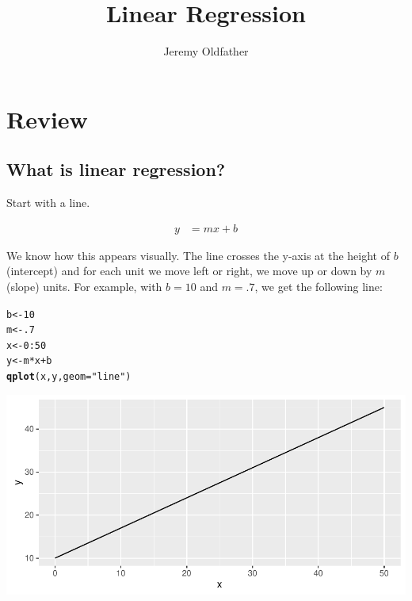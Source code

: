 \documentclass[10pt]{article}\usepackage[]{graphicx}\usepackage[]{color}
\makeatletter
\def\maxwidth{ %
  \ifdim\Gin@nat@width>\linewidth
    \linewidth
  \else
    \Gin@nat@width
  \fi
}
\newcommand{\hlnum}[1]{\textcolor[rgb]{0.686,0.059,0.569}{#1}}%
\newcommand{\hlstr}[1]{\textcolor[rgb]{0.192,0.494,0.8}{#1}}%
\newcommand{\hlopt}[1]{\textcolor[rgb]{0,0,0}{#1}}%
\newcommand{\hlstd}[1]{\textcolor[rgb]{0.345,0.345,0.345}{#1}}%
\newcommand{\hlkwb}[1]{\textcolor[rgb]{0.69,0.353,0.396}{#1}}%
\newcommand{\hlkwc}[1]{\textcolor[rgb]{0.333,0.667,0.333}{#1}}%
\newcommand{\hlkwd}[1]{\textcolor[rgb]{0.737,0.353,0.396}{\textbf{#1}}}%
\newenvironment{kframe}{%
 \def\at@end@of@kframe{}%
 \ifinner\ifhmode%
  \def\at@end@of@kframe{\end{minipage}}%
  \begin{minipage}{\columnwidth}%
 \fi\fi%
 \def\FrameCommand##1{\hskip\@totalleftmargin \hskip-\fboxsep
 \colorbox{shadecolor}{##1}\hskip-\fboxsep
     \hskip-\linewidth \hskip-\@totalleftmargin \hskip\columnwidth}%
 \MakeFramed {\advance\hsize-\width
   \@totalleftmargin\z@ \linewidth\hsize
   \@setminipage}}%
 {\par\unskip\endMakeFramed%
 \at@end@of@kframe}
\newenvironment{knitrout}{}{} %
\makeatother
\begin{document}
\title{Linear Regression}
\author{Jeremy Oldfather}
\maketitle



\section*{Review}

\subsection*{What is linear regression?}

Start with a line.

\begin{align}
y &= mx + b \label{line}
\end{align}


We know how this appears visually. The line crosses the y-axis at the height of $b$ (intercept) and for each unit we move left or right, we move up or down by $m$ (slope) units. For example, with $b=10$ and $m=.7$, we get the following line:

\begin{knitrout}\small
{}\color{fgcolor}\begin{kframe}
\begin{alltt}
\hlstd{b}\hlkwb{<-}\hlnum{10}
\hlstd{m}\hlkwb{<-}\hlnum{.7}
\hlstd{x}\hlkwb{<-}\hlnum{0}\hlopt{:}\hlnum{50}
\hlstd{y}\hlkwb{<-}\hlstd{m}\hlopt{*}\hlstd{x} \hlopt{+} \hlstd{b}
\hlkwd{qplot}\hlstd{(x,y,}\hlkwc{geom}\hlstd{=}\hlstr{"line"}\hlstd{)}
\end{alltt}
\end{kframe}

{\centering \includegraphics[width=\maxwidth]{figure/simple_line-1} 

}



\end{knitrout}
\end{document}
